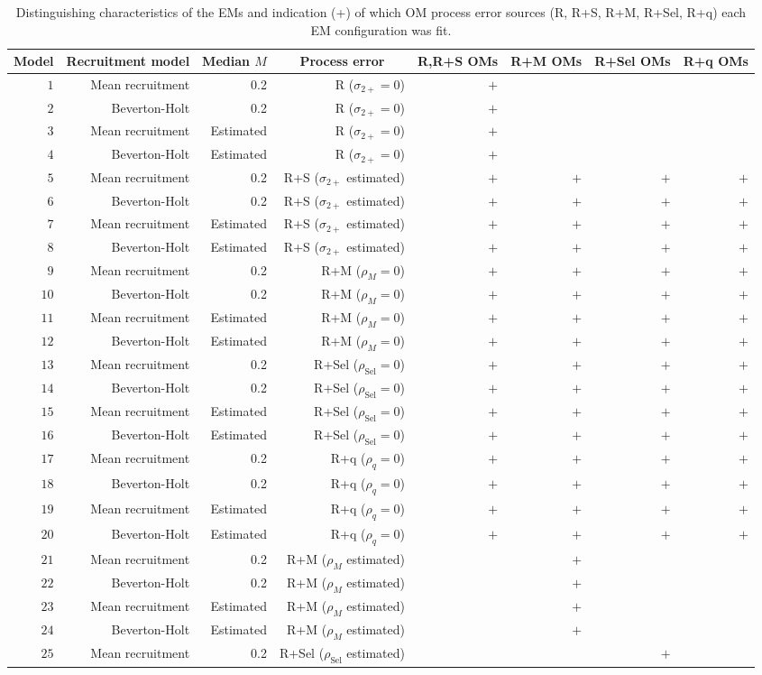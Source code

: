 \documentclass[
  12pt,
]{article}
\begin{document}
\begin{table}
\caption{Distinguishing characteristics of the EMs and indication (+) of which OM process error sources (R, R+S, R+M, R+Sel, R+q) each EM configuration was fit.}\label{em_table}
{\scriptsize \begin{center}
\begin{tabular}{rrrrrrrr}
\hline\hline
\multicolumn{1}{c}{Model}&\multicolumn{1}{c}{Recruitment model}&\multicolumn{1}{c}{Median $M$}&\multicolumn{1}{c}{Process error}&\multicolumn{1}{c}{R,R+S OMs}&\multicolumn{1}{c}{R+M OMs}&\multicolumn{1}{c}{R+Sel OMs}&\multicolumn{1}{c}{R+q OMs}\tabularnewline
\hline
$ 1$&Mean recruitment&0.2&R ($\sigma_{2+} = 0$)&$+$&&&\tabularnewline
$ 2$&Beverton-Holt&0.2&R ($\sigma_{2+} = 0$)&$+$&&&\tabularnewline
$ 3$&Mean recruitment&Estimated&R ($\sigma_{2+} = 0$)&$+$&&&\tabularnewline
$ 4$&Beverton-Holt&Estimated&R ($\sigma_{2+} = 0$)&$+$&&&\tabularnewline
$ 5$&Mean recruitment&0.2&R+S ($\sigma_{2+}$ estimated)&$+$&$+$&$+$&$+$\tabularnewline
$ 6$&Beverton-Holt&0.2&R+S ($\sigma_{2+}$ estimated)&$+$&$+$&$+$&$+$\tabularnewline
$ 7$&Mean recruitment&Estimated&R+S ($\sigma_{2+}$ estimated)&$+$&$+$&$+$&$+$\tabularnewline
$ 8$&Beverton-Holt&Estimated&R+S ($\sigma_{2+}$ estimated)&$+$&$+$&$+$&$+$\tabularnewline
$ 9$&Mean recruitment&0.2&R+M ($\rho_{M} = 0$)&$+$&$+$&$+$&$+$\tabularnewline
$10$&Beverton-Holt&0.2&R+M ($\rho_{M} = 0$)&$+$&$+$&$+$&$+$\tabularnewline
$11$&Mean recruitment&Estimated&R+M ($\rho_{M} = 0$)&$+$&$+$&$+$&$+$\tabularnewline
$12$&Beverton-Holt&Estimated&R+M ($\rho_{M} = 0$)&$+$&$+$&$+$&$+$\tabularnewline
$13$&Mean recruitment&0.2&R+Sel ($\rho_{\text{Sel}} = 0$)&$+$&$+$&$+$&$+$\tabularnewline
$14$&Beverton-Holt&0.2&R+Sel ($\rho_{\text{Sel}} = 0$)&$+$&$+$&$+$&$+$\tabularnewline
$15$&Mean recruitment&Estimated&R+Sel ($\rho_{\text{Sel}} = 0$)&$+$&$+$&$+$&$+$\tabularnewline
$16$&Beverton-Holt&Estimated&R+Sel ($\rho_{\text{Sel}} = 0$)&$+$&$+$&$+$&$+$\tabularnewline
$17$&Mean recruitment&0.2&R+q ($\rho_{q} = 0$)&$+$&$+$&$+$&$+$\tabularnewline
$18$&Beverton-Holt&0.2&R+q ($\rho_{q} = 0$)&$+$&$+$&$+$&$+$\tabularnewline
$19$&Mean recruitment&Estimated&R+q ($\rho_{q} = 0$)&$+$&$+$&$+$&$+$\tabularnewline
$20$&Beverton-Holt&Estimated&R+q ($\rho_{q} = 0$)&$+$&$+$&$+$&$+$\tabularnewline
$21$&Mean recruitment&0.2&R+M ($\rho_{M}$ estimated)&&$+$&&\tabularnewline
$22$&Beverton-Holt&0.2&R+M ($\rho_{M}$ estimated)&&$+$&&\tabularnewline
$23$&Mean recruitment&Estimated&R+M ($\rho_{M}$ estimated)&&$+$&&\tabularnewline
$24$&Beverton-Holt&Estimated&R+M ($\rho_{M}$ estimated)&&$+$&&\tabularnewline
$25$&Mean recruitment&0.2&R+Sel ($\rho_{\text{Sel}}$ estimated)&&&$+$&\tabularnewline

\end{tabular}
\end{center}}
\end{table}
\end{document}

